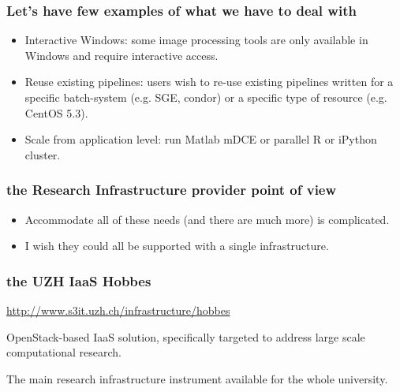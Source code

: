 \documentclass[english,serif,mathserif,xcolor=pdftex,dvipsnames,table]{beamer}
\begin{document}
\begin{frame}
  \frametitle{Let's have few examples of what we have to deal with}
  
  \begin{itemize}
  \item {\color{Blue}Interactive Windows}: some image processing tools
    are only available in Windows and require interactive access.
  \item {\color{Blue}Reuse existing pipelines}: users wish to re-use
    existing pipelines written for a specific batch-system (e.g. SGE,
    condor) or a specific type of resource (e.g. CentOS 5.3).
  \item {\color{Blue}Scale from application level}: run Matlab mDCE
    or parallel R or iPython cluster. 
  \end{itemize}
\end{frame}

\begin{frame}
  \frametitle{the Research Infrastructure provider point of view}

  \begin{itemize}
  \item Accommodate all of these needs (and there are much more) is
    {\color{Blue}complicated}.
  \item I wish they could all be supported with a {\color{Blue}single
      infrastructure}.
  \end{itemize}
\end{frame}

\begin{frame}
  \frametitle{the UZH IaaS Hobbes}

\url{http://www.s3it.uzh.ch/infrastructure/hobbes}

\+
{\color{Blue}OpenStack}-based IaaS solution, specifically
      targeted to address large scale computational research.

      \+
The main {\color{Blue}research infrastructure instrument}
      available for the whole university.

 \end{frame}
\end{document}
